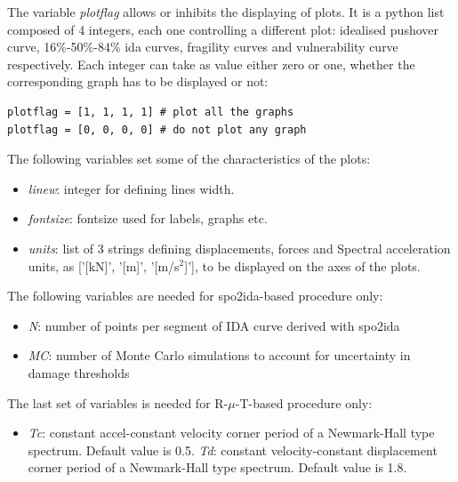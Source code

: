 The variable \textit{plotflag} allows or inhibits the displaying of plots. It is a python list composed of 4 integers, each one controlling a different plot: idealised pushover curve, 16\%-50\%-84\% ida curves, fragility curves and vulnerability curve respectively. Each integer can take as value either zero or one, whether the corresponding graph has to be displayed or not:

\begin{Verbatim}[frame=single, commandchars=\\\{\}, samepage=true]
plotflag = [1, 1, 1, 1] # plot all the graphs
plotflag = [0, 0, 0, 0] # do not plot any graph
\end{Verbatim}

The following variables set some of the characteristics of the plots:

\begin{itemize}
\item \textit{linew}: integer for defining lines width.
\item \textit{fontsize}: fontsize used for labels, graphs etc.
\item \textit{units}: list of 3 strings defining displacements, forces and Spectral acceleration units, as ['[kN]', '[m]', '[m/s$^2$]'], to be displayed on the axes of the plots.
\end{itemize}

The following variables are needed for spo2ida-based procedure only:
\begin{itemize}
\item \textit{N}: number of points per segment of IDA curve derived with spo2ida
\item \textit{MC}: number of Monte Carlo simulations to account for uncertainty in damage thresholds
\end{itemize}

The last set of variables is needed for R-$\mu$-T-based procedure only:
\begin{itemize}
\item \textit{Tc}: constant accel-constant velocity corner period of a Newmark-Hall type spectrum. Default value is 0.5.
\textit{Td}: constant velocity-constant displacement corner period of a Newmark-Hall type spectrum. Default value is 1.8.
\end{itemize}